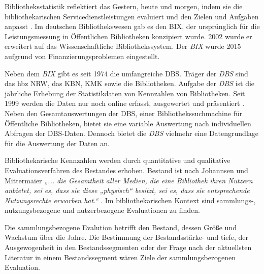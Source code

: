 Bibliotheksstatistik reflektiert das Gestern, heute und morgen, indem 
sie die bibliothekarischen Servicedienstleistungen evaluiert und den Zielen und Aufgaben anpasst \cite[vgl.][2 f.]{jilovsky_cathie_library_2004}.
Im deutschen Bibliothekswesen gab es den \acrfull{BIX}, der ursprünglich 
für die Leistungsmessung in Öffentlichen Bibliotheken konzipiert wurde. 
2002 wurde er erweitert auf das Wissenschaftliche Bibliothekssystem. 
Der \textit{\acrshort{BIX}} wurde 2015 aufgrund von Finanzierungsproblemen eingestellt. 


Neben dem \textit{\acrlong{BIX}} gibt es seit 1974 die umfangreiche \acrfull{DBS}. 
Träger der \textit{\acrshort{DBS}} sind das \acrfull{hbz NRW},  das \acrfull{KBN}, \acrfull{KMK} sowie die Bibliotheken.
Aufgabe der \textit{\acrshort{DBS}} ist die jährliche Erhebung der Statistikdaten von Kennzahlen von Bibliotheken. 
Seit 1999 werden die Daten nur noch online erfasst, ausgewertet und präsentiert \cite[vgl.][2]{schmidt_deutsche_2008}.
Neben den Gesamtauswertungen der DBS, einer Bibliothekssuchmachine für Öffentliche Bibliotheken, 
bietet sie eine variable Auswertung nach individuellen Abfragen der DBS-Daten. 
Dennoch bietet die \textit{\acrshort{DBS}} vielmehr eine Datengrundlage für die Auswertung der Daten an.

Bibliothekarische Kennzahlen werden durch quantitative und qualitative Evaluationsverfahren des Bestandes erhoben.
Bestand ist nach Johannsen und Mittermaier \textit{„... die Gesamtheit aller Medien, die eine Bibliothek ihren Nutzern anbietet, sei es, dass sie diese 
„physisch“ besitzt, sei es, dass sie entsprechende Nutzungsrechte erworben hat.“} \cite[252]{johannsen_jochen_bestands-_2015}.
Im bibliothekarischen Kontext sind sammlungs-, nutzungsbezogene und nutzerbezogene Evaluationen zu finden.\cite[vgl.][302]{johnson_peggy_fundamentals_2014}

Die sammlungsbezogene Evalution betrifft den Bestand, dessen Größe und Wachstum über die Jahre. Die Bestimmung der Bestandsstärke- und tiefe, 
der Ausgewogenheit in den Bestandssegmenten oder der Frage nach der aktuellsten Literatur in einem Bestandssegment wären Ziele der sammlungsbezogenen Evaluation. 


